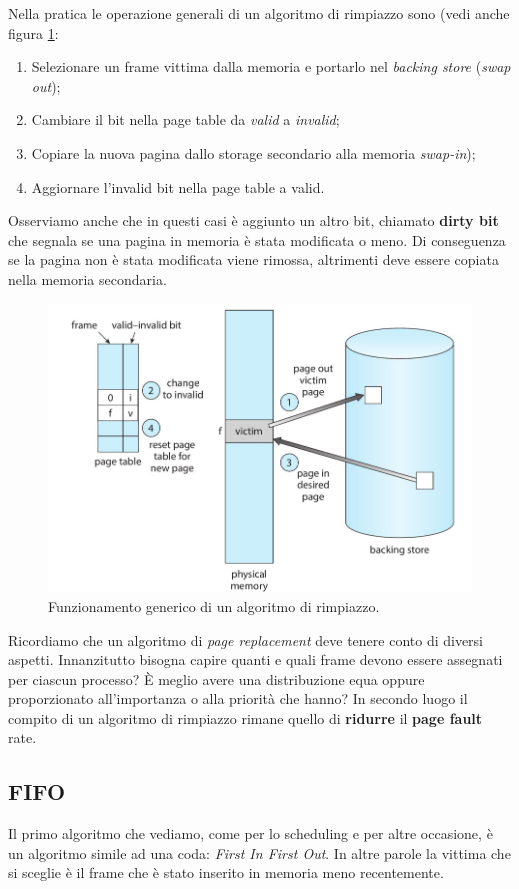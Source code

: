 Nella pratica le operazione generali di un algoritmo di rimpiazzo sono (vedi anche figura \ref{fig:replacement_algorithm}:
\vspace{-5px}
\begin{enumerate}
\setlength{\itemsep}{-.25 em}
    \item Selezionare un frame vittima dalla memoria e portarlo nel \textit{backing store} (\textit{swap out});
    \item Cambiare il bit nella page table da \textit{valid} a \textit{invalid};
    \item Copiare la nuova pagina dallo storage secondario alla memoria \textit{swap-in}); 
    \item Aggiornare l'invalid bit nella page table a valid.
\end{enumerate}
Osserviamo anche che in questi casi è aggiunto un altro bit, chiamato \textbf{dirty bit} che segnala se una pagina in memoria è stata modificata o meno. Di conseguenza se la pagina non è stata modificata viene rimossa, altrimenti deve essere copiata nella memoria secondaria. 
\begin{figure}[h]
    \centering
    \includegraphics[width = .65\textwidth]{../res/imgs/virtual memory/replacement_algorithm.png}
    \caption{Funzionamento generico di un algoritmo di rimpiazzo.}
    \label{fig:replacement_algorithm}
\end{figure}

Ricordiamo che un algoritmo di \textit{page replacement} deve tenere conto di diversi aspetti. Innanzitutto bisogna capire quanti e quali frame devono essere assegnati per ciascun processo? È meglio avere una distribuzione equa oppure proporzionato all'importanza o alla priorità che hanno? In secondo luogo il compito di un algoritmo di rimpiazzo rimane quello di \textbf{ridurre} il \textbf{page fault} rate.

% 
\subsection{FIFO}
Il primo algoritmo che vediamo, come per lo scheduling e per altre occasione, è un algoritmo simile ad una coda: \textit{First In First Out}. In altre parole la vittima che si sceglie è il frame che è stato inserito in memoria meno recentemente.

